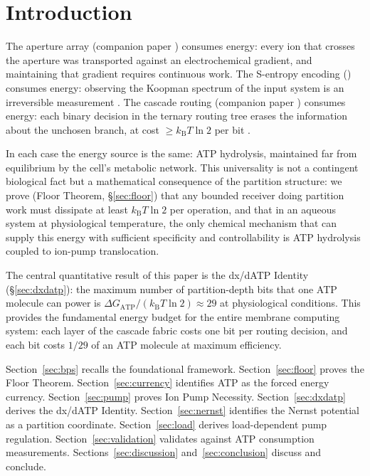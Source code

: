\documentclass[11pt,twocolumn,a4paper]{article}
\theoremstyle{definition}
\theoremstyle{remark}
\newcommand{\kB}{k_{\mathrm{B}}}
\begin{document}
\section{Introduction}
\label{sec:introduction}

The aperture array (companion paper \citep{companion3}) consumes energy: every
ion that crosses the aperture was transported against an electrochemical gradient,
and maintaining that gradient requires continuous work. The S-entropy encoding
(\citep{companion2}) consumes energy: observing the Koopman spectrum of the input
system is an irreversible measurement \citep{landauer1961, szilard1929}.
The cascade routing (companion paper \citep{companion5}) consumes energy: each
binary decision in the ternary routing tree erases the information about the
unchosen branch, at cost $\geq \kB T \ln 2$ per bit \citep{landauer1961}.

In each case the energy source is the same: ATP hydrolysis, maintained far from
equilibrium by the cell's metabolic network. This universality is not a
contingent biological fact but a mathematical consequence of the partition
structure: we prove (Floor Theorem, \S\ref{sec:floor}) that any bounded receiver
doing partition work must dissipate at least $\kB T \ln 2$ per operation, and
that in an aqueous system at physiological temperature, the only chemical
mechanism that can supply this energy with sufficient specificity and controllability
is ATP hydrolysis coupled to ion-pump translocation.

The central quantitative result of this paper is the dx/dATP Identity
(\S\ref{sec:dxdatp}): the maximum number of partition-depth bits that one ATP
molecule can power is $\Delta G_{\mathrm{ATP}} / (\kB T \ln 2) \approx 29$ at
physiological conditions. This provides the fundamental energy budget for
the entire membrane computing system: each layer of the cascade fabric
\citep{companion5} costs one bit per routing decision, and each bit costs
$1/29$ of an ATP molecule at maximum efficiency.

Section~\ref{sec:bps} recalls the foundational framework.
Section~\ref{sec:floor} proves the Floor Theorem.
Section~\ref{sec:currency} identifies ATP as the forced energy currency.
Section~\ref{sec:pump} proves Ion Pump Necessity.
Section~\ref{sec:dxdatp} derives the dx/dATP Identity.
Section~\ref{sec:nernst} identifies the Nernst potential as a partition coordinate.
Section~\ref{sec:load} derives load-dependent pump regulation.
Section~\ref{sec:validation} validates against ATP consumption measurements.
Sections~\ref{sec:discussion} and~\ref{sec:conclusion} discuss and conclude.
\end{document}
